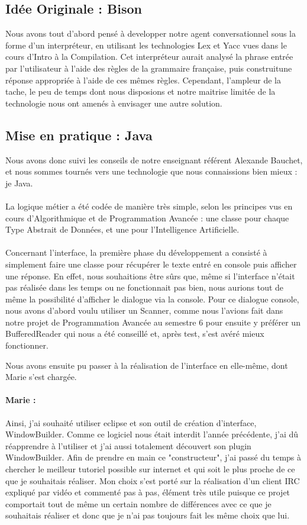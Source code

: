 \subsection{Idée Originale : Bison} Nous avons tout d'abord pensé à developper notre agent conversationnel sous la forme d'un interpréteur, en utilisant les technologies Lex et Yacc vues dans le cours d'Intro à la Compilation. Cet interpréteur aurait analysé la phrase entrée par l'utilisateur à l'aide des règles de la grammaire française, puis construitune réponse appropriée à l'aide de ces mêmes règles. Cependant, l'ampleur de la tache, le peu de temps dont nous disposions et notre maitrise limitée de la technologie nous ont amenés à envisager une autre solution.

\subsection{Mise en pratique : Java}
Nous avons donc suivi les conseils de notre enseignant référent Alexande Bauchet, et nous sommes tournés vers une technologie que nous connaissions bien mieux : je Java.
\paragraph{}La logique métier a été codée de manière très simple, selon les principes vus en cours d'Algorithmique et de Programmation Avancée : une classe pour chaque Type Abstrait de Données, et une pour l'Intelligence Artificielle.
\paragraph{}Concernant l'interface, la première phase du développement a consisté à simplement faire une classe pour récupérer le texte entré en console puis afficher une réponse. En effet, nous souhaitions être sûrs que, même si l'interface n'était pas réalisée dans les temps ou ne fonctionnait pas bien, nous aurions tout de même la possibilité d'afficher le dialogue via la console. 
Pour ce dialogue console, nous avons d'abord voulu utiliser un Scanner, comme nous l'avions fait dans notre projet de Programmation Avancée au semestre 6 pour ensuite y préférer un BufferedReader qui nous a été conseillé et, après test, s'est avéré mieux fonctionner.

Nous avons ensuite pu passer à la réalisation de l'interface en elle-même, dont Marie s'est chargée. 
\paragraph{Marie : }Ainsi, j'ai souhaité utiliser eclipse et son outil de création d'interface, WindowBuilder. Comme ce logiciel nous était interdit l'année précédente, j'ai dû réapprendre à l'utiliser et j'ai aussi totalement découvert son plugin WindowBuilder. Afin de prendre en main ce "constructeur", j'ai passé du temps à chercher le meilleur tutoriel possible sur internet et qui soit le plus proche de ce que je souhaitais réaliser. Mon choix s'est porté sur la réalisation d'un client IRC expliqué par vidéo et commenté pas à pas, élément très utile puisque ce projet comportait tout de même un certain nombre de différences avec ce que je souhaitais réaliser et donc que je n'ai pas toujours fait les même choix que lui. 
